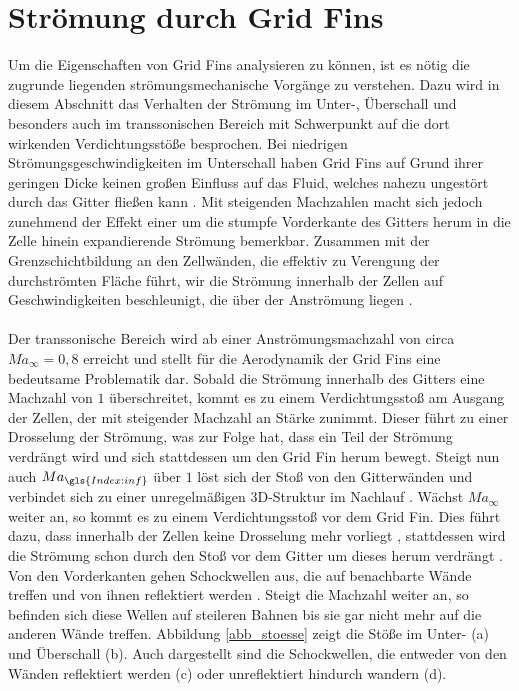 \section{Strömung durch Grid Fins}\label{stroe}
Um die Eigenschaften von Grid Fins analysieren zu können, ist es nötig die zugrunde liegenden strömungsmechanische Vorgänge zu verstehen. Dazu wird in diesem Abschnitt das Verhalten der Strömung im Unter-, Überschall und besonders auch im transsonischen Bereich mit Schwerpunkt auf die dort wirkenden Verdichtungsstöße besprochen.
Bei niedrigen Strömungsgeschwindigkeiten im Unterschall haben Grid Fins auf Grund ihrer geringen Dicke keinen großen Einfluss auf das Fluid, welches nahezu ungestört durch das Gitter fließen kann \cite{sb-sharp}. Mit steigenden Machzahlen macht sich jedoch zunehmend der Effekt einer um die stumpfe Vorderkante des Gitters herum in die Zelle hinein expandierende Strömung bemerkbar. Zusammen mit der Grenzschichtbildung an den Zellwänden, die effektiv zu Verengung der durchströmten Fläche führt, wir die Strömung innerhalb der Zellen auf Geschwindigkeiten beschleunigt, die über der Anströmung liegen \cite{synopsis}.
\\~\\
Der transsonische Bereich wird ab einer Anströmungsmachzahl von circa $Ma_\infty=0,8$ erreicht \cite{machgrenzen} und stellt für die Aerodynamik der Grid Fins eine bedeutsame Problematik dar. Sobald die Strömung innerhalb des Gitters eine Machzahl von $1$ überschreitet, kommt es zu einem Verdichtungsstoß am Ausgang der Zellen, der mit steigender Machzahl an Stärke zunimmt. Dieser führt zu einer Drosselung der Strömung, was zur Folge hat, dass ein Teil der Strömung verdrängt wird und sich stattdessen um den Grid Fin herum bewegt. Steigt nun auch $Ma_{\gls{Index:inf}}$ über $1$ löst sich der Stoß von den Gitterwänden und verbindet sich zu einer unregelmäßigen 3D-Struktur im Nachlauf \cite{stroemung}. Wächst $Ma_\infty$ weiter an, so kommt es zu einem Verdichtungsstoß vor dem Grid Fin. Dies führt dazu, dass innerhalb der Zellen keine Drosselung mehr vorliegt \cite{stroemung}, stattdessen wird die Strömung schon durch den Stoß vor dem Gitter um dieses herum verdrängt \cite{synopsis}. Von den Vorderkanten gehen Schockwellen aus, die auf benachbarte Wände treffen und von ihnen reflektiert werden \cite{synopsis}. Steigt die Machzahl weiter an, so befinden sich diese Wellen auf steileren Bahnen bis sie gar nicht mehr auf die anderen Wände treffen. Abbildung \ref{abb_stoesse} zeigt die Stöße im Unter- (a) und Überschall (b). Auch dargestellt sind die Schockwellen, die entweder von den Wänden reflektiert werden (c) oder unreflektiert hindurch wandern (d).
